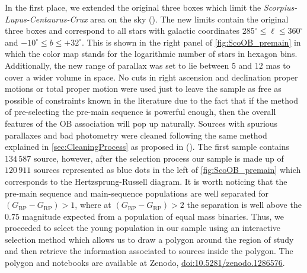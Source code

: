 In the first place, we extended the original three boxes which limit the \textit{Scorpius-Lupus-Centaurus-Crux} area on the sky  (\citeyear{Blaauw46}). The new limits contain the original three boxes and correspond to all stars with galactic coordinates $285^\circ\leq\ell\leq360^\circ$ and $-10^\circ\leq b\leq+32^\circ$. This is shown in the right panel of \autoref{fig:ScoOB_premain} in which the color map stands for the logarithmic number of stars in hexagon bins. Additionally, the new range of parallax was set to lie between $5$ and $12$ mas to cover a wider volume in space. No cuts in right ascension and declination proper motions or total proper motion were used just to leave the sample as free as possible of constraints known in the literature due to the fact that if the method of pre-selecting the pre-main sequence is powerful enough, then the overall features of the OB association will pop up naturally. Sources with spurious parallaxes and bad photometry were cleaned following the same method explained in \autoref{sec:CleaningProcess} as proposed in  (\citeyear{2018arXiv180409366L}). The first sample contains $134\,587$ source, however, after the selection process our sample is made up of $120\,911$ sources represented as blue dots in the left of \autoref{fig:ScoOB_premain} which corresponds to the Hertzsprung-Russell diagram. It is worth noticing that the pre-main sequence and main-sequence populations are well separated for $(G_\mathrm{BP}-G_\mathrm{RP})>1$, where at $(G_\mathrm{BP}-G_\mathrm{RP})>2$ the separation is well above the $0.75$ magnitude expected from a population of equal mass binaries. Thus, we proceeded to select the young population in our sample using an interactive selection method which allows us to draw a polygon around the region of study and then retrieve the information associated to sources inside the polygon. The polygon and notebooks are available at Zenodo, \href{https://zenodo.org/record/1286576#.Wx6NAmMzaV4}{doi:10.5281/zenodo.1286576}.\\ 

